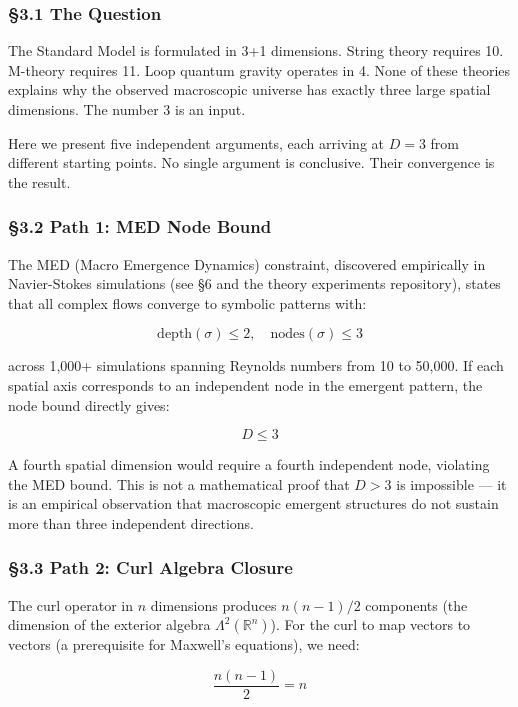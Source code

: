 \documentclass[
  11pt,
  a4paper]{article}
\begin{document}
\subsubsection{§3.1 The Question}\label{the-question}

The Standard Model is formulated in 3+1 dimensions. String theory
requires 10. M-theory requires 11. Loop quantum gravity operates in 4.
None of these theories explains why the observed macroscopic universe
has exactly three large spatial dimensions. The number 3 is an input.

Here we present five independent arguments, each arriving at \(D = 3\)
from different starting points. No single argument is conclusive. Their
convergence is the result.

\subsubsection{§3.2 Path 1: MED Node Bound}\label{path-1-med-node-bound}

The MED (Macro Emergence Dynamics) constraint, discovered empirically in
Navier-Stokes simulations (see §6 and the theory experiments
repository), states that all complex flows converge to symbolic patterns
with:

\[\text{depth}(\sigma) \leq 2, \quad \text{nodes}(\sigma) \leq 3\]

across 1,000+ simulations spanning Reynolds numbers from 10 to 50,000.
If each spatial axis corresponds to an independent node in the emergent
pattern, the node bound directly gives:

\[D \leq 3\]

A fourth spatial dimension would require a fourth independent node,
violating the MED bound. This is not a mathematical proof that \(D > 3\)
is impossible --- it is an empirical observation that macroscopic
emergent structures do not sustain more than three independent
directions.

\subsubsection{§3.3 Path 2: Curl Algebra
Closure}\label{path-2-curl-algebra-closure}

The curl operator in \(n\) dimensions produces \(n(n-1)/2\) components
(the dimension of the exterior algebra \(\Lambda^2(\mathbb{R}^n)\)). For
the curl to map vectors to vectors (a prerequisite for Maxwell's
equations), we need:

\[\frac{n(n-1)}{2} = n\]
\end{document}
